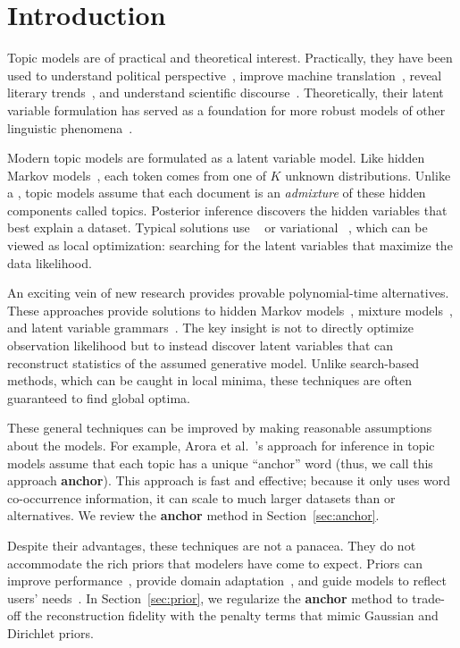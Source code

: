 \section{Introduction}
\label{sec:intro}

Topic models are of practical and theoretical interest.  Practically,
they have been used to understand political
perspective~\cite{paul-10}, improve machine
translation~\cite{Eidelman-12}, reveal literary
trends~\cite{jockers-13}, and understand scientific
discourse~\cite{hall-08}.  Theoretically, their latent variable
formulation has served as a foundation for more robust models of other
linguistic phenomena~\cite{brody-09}.

Modern topic models are formulated as a latent variable model.  Like
hidden Markov models~\cite[]{rabiner-89}, each token comes
from one of $K$ unknown distributions.  Unlike a , topic
models assume that each document is an \emph{admixture} of these
hidden components called topics.  Posterior inference discovers the
hidden variables that best explain a dataset.  Typical solutions use
~\cite{griffiths-04} or variational ~\cite{blei-03},
which can be viewed as local optimization: searching for the latent
variables that maximize the data likelihood.

An exciting vein of new research provides provable polynomial-time
alternatives.  These approaches provide solutions to hidden Markov
models~\cite{anandkumar-12:hmm}, mixture models~\cite{kannan-05}, and
latent variable grammars~\cite{cohen-13b}. The key insight is not to
directly optimize observation likelihood but to instead discover
latent variables that can reconstruct statistics of the assumed
generative model.  Unlike search-based methods, which can be caught in
local minima, these techniques are often guaranteed to find global
optima.

These general techniques can be improved by making reasonable
assumptions about the models.  For example, Arora et
al.~'s approach for inference in topic models
assume that each topic has a unique ``anchor'' word (thus, we call
this approach {\bf anchor}).  This approach is fast and effective;
because it only uses word co-occurrence information, it can scale to
much larger datasets than  or  alternatives.  We
review the {\bf anchor} method in Section~\ref{sec:anchor}.

Despite their advantages, these techniques are not a panacea.  They do
not accommodate the rich priors that modelers have come to expect.
Priors can improve performance~\cite{wallach-09b}, provide domain
adaptation~\cite{daume-07,finkel-09}, and guide models to reflect
users' needs~\cite{hu-13:itm}.  In Section~\ref{sec:prior}, we
regularize the {\bf anchor} method to trade-off the reconstruction
fidelity with the penalty terms that mimic Gaussian and Dirichlet
priors.

